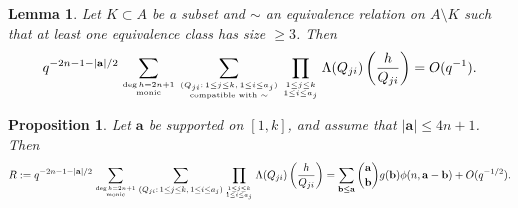 \documentclass[10pt,a4paper]{amsart}
\newtheorem{prop}{Proposition}
\newtheorem{lem}{Lemma}
\begin{document}
\begin{lem}\label{lem_sums_in_inclusion_exclusion} Let $K\subset A$ be a subset and $\sim$ an equivalence relation on $A\setminus K$ such that at least one equivalence class has size $\ge 3$. Then
\begin{equation}\label{eq: lem triple}q^{-2n-1-|\mathbf a|/2}\sum_{\deg h=2n+1\atop{\text{monic}}}\sum_{(Q_{ji}:\,1\le j\le k,\,1\le i\le a_j)\atop{\text{compatible with $\sim$}}}\prod_{1\le j\le k\atop{1\le i\le a_j}}\Lambda(Q_{ji})\left(\frac h{Q_{ji}}\right)=O(q^{-1}).\end{equation}
\end{lem}

\begin{prop}\label{prop_main_sum_estimate}
    Let $\mathbf a$ be supported on $[1,k]$, and assume that $|\mathbf a|\le 4n+1$. Then
    \begin{equation*}
    R:=q^{-2n-1-|\mathbf a|/2}\sum_{\deg h=2n+1\atop{\mathrm{monic}}}\sum_{(Q_{ji}:\,1\le j\le k,\,1\le i\le a_j)}\prod_{1\le j\le k\atop{1\le i\le a_j}}\Lambda(Q_{ji})\left(\frac{h}{Q_{ji}}\right)
    =\sum_{\mathbf b\le\mathbf a}{\mathbf a\choose\mathbf b}g(\mathbf b)\phi(n,\mathbf a-\mathbf b)+O(q^{-{1/2}}).
    \end{equation*}
\end{prop}
\end{document}
